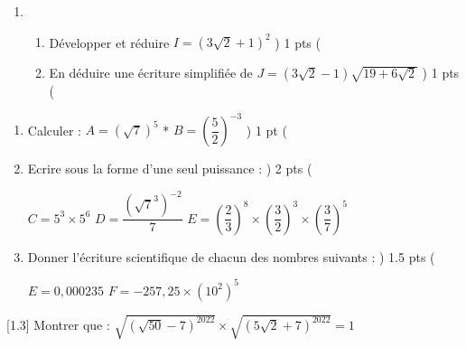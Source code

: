 \documentclass[10pt,a4paper]{article}
\newcommand{\lr}[1]{\left(#1\right)}
\newenvironment{enum}{
\begin{enumerate}
   \setlength{\itemsep}{2pt}
  \setlength{\parskip}{5pt}
   \setlength{\rightskip}{7mm}
}{\end{enumerate}}
\newcommand{\lr}[1]{ \left(#1\right)}
\begin{document}
\begin{ascolorbox14}{}
\begin{exo}[colbacktitle=blue!40 ]{\textcolor{ white}{
{}}}
\begin{enumerate}
\begin{tabenum}
\tabenumitem[] \qquad \;
\tabenumitem[] \qquad \;
\tabenumitem[] $ E = 4x^{2}-9 + \lr{2x-3}\lr{5x-2} $
\tabenumitem[] 
\end{tabenum}
\item \begin{enum}\setlength{\itemsep}{-1pt}
\item Développer et réduire   $ I=\lr{ 3\sqrt{2} + 1 }^{2} $  { \Timeffont \dotfill  } { \Maghrfont ) 1 \sfont pts  \Maghrfont ( }
\item  En déduire une écriture simplifiée  de  $ J = \lr{3\sqrt{2} -1}\sqrt{19 + 6\sqrt{2}} $ { \Timeffont \dotfill  } { \Maghrfont ) 1 \sfont pts  \Maghrfont ( }
\end{enum}
\end{enumerate} 
\end{exo}
\begin{exo}[colbacktitle=blue!40 ]{\textcolor{ white}{
{}}}
\vspace*{-0.008\linewidth}
\begin{enumerate} \setlength{\itemsep}{-2pt}
\item Calculer : \; $  A = \lr{\sqrt{7}}^{5} $   \quad ** \quad   $ B = \lr{\dfrac{5}{2}}^{-3}   $ { \Timeffont \dotfill  } { \Maghrfont ) 1 \sfont pt  \Maghrfont ( }
\vspace*{-0.008\linewidth}
\item Ecrire sous la forme d'une seul puissance : { \Timeffont \dotfill  } { \Maghrfont ) 2 \sfont pts  \Maghrfont ( } 
\begin{tabenum}
\tabenumitem[] \qquad \;
\tabenumitem[] \qquad \;
\tabenumitem[] $ C =5^{3} \times 5^{6}  $
\tabenumitem[**]
\tabenumitem[] $ D = \dfrac{\lr{\sqrt{7}^{3}}^{-2}}{7} $ 
\tabenumitem[**]
\tabenumitem[] $ E = \lr{\dfrac{2}{3}}^{8} \times \lr{\dfrac{3}{2}}^{3} \times \lr{\dfrac{3}{7}}^{5} $ 
\end{tabenum}
\vspace*{-0.01\linewidth}
\item Donner l'écriture scientifique de chacun des nombres suivants : { \Timeffont \dotfill  } { \Maghrfont ) 1.5 \sfont pts  \Maghrfont ( }
\begin{tabenum}
\tabenumitem[] \qquad \;
\tabenumitem[] \qquad \;
\tabenumitem[] $ E= 0,000235 $
\tabenumitem[**]
\tabenumitem[] $ F = - 257,25 \times \lr{10^{2}}^{5} $
\end{tabenum}
\end{enumerate}
\end{exo}
\begin{exo}[colbacktitle=blue!40 ]{\textcolor{ white}{
{}}}
\; \;  {\Large \scalebox{-1.3}[1.3]{\Large  {} }} Montrer que : \; \;  $ \sqrt{\lr{\sqrt{50} - 7}^{2022}} \times \sqrt{\lr{5\sqrt{2} + 7}^{2022}} = 1 $ 
\end{exo}
\end{ascolorbox14}
\end{document}
